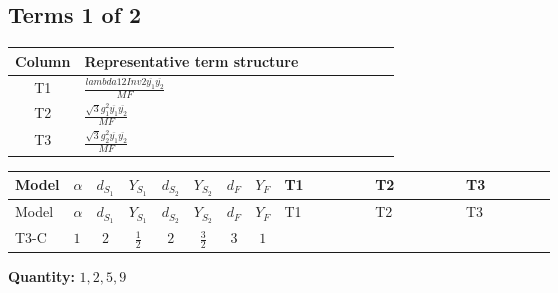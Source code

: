 \documentclass[8pt]{article}
\begin{document}
\begin{landscape}
\subsection*{Terms 1 of 2}
\begin{center}
\begin{tabular}{@{}c >{\raggedright\arraybackslash}p{0.82\linewidth}@{}}
\toprule
Column & Representative term structure \\
\midrule
T1 & \(\displaystyle \frac{lambda12Inv2 \overline{y_{1}} \overline{y_{2}}}{MF}\) \\
\midrule
T2 & \(\displaystyle \frac{\sqrt{3} g_{1}^{2} \overline{y_{1}} \overline{y_{2}}}{MF}\) \\
\midrule
T3 & \(\displaystyle \frac{\sqrt{3} g_{2}^{2} \overline{y_{1}} \overline{y_{2}}}{MF}\) \\
\midrule
\bottomrule
\end{tabular}
\end{center}
\smallskip
\tiny
\begin{longtable}{@{}llcccccc >{\raggedright\arraybackslash}p{0.21\linewidth} >{\raggedright\arraybackslash}p{0.21\linewidth} >{\raggedright\arraybackslash}p{0.21\linewidth}@{}}
\toprule
Model & $\alpha$ & $d_{S_1}$ & $Y_{S_1}$ & $d_{S_2}$ & $Y_{S_2}$ & $d_F$ & $Y_F$ & T1 & T2 & T3 \\
\midrule
\endfirsthead
\toprule
Model & $\alpha$ & $d_{S_1}$ & $Y_{S_1}$ & $d_{S_2}$ & $Y_{S_2}$ & $d_F$ & $Y_F$ & T1 & T2 & T3 \\
\midrule
\endhead
T3-C & $1$ & $2$ & $\frac{1}{2}$ & $2$ & $\frac{3}{2}$ & $3$ & $1$ & \scriptsize\adjustbox{max width=\linewidth}{$\begin{gathered} - \frac{lambda12Inv2 \overline{y_{1}} \overline{y_{2}}}{6 MF}\end{gathered}$} & \scriptsize\adjustbox{max width=\linewidth}{$\begin{gathered} - \frac{\sqrt{3} g_{1}^{2} \overline{y_{1}} \overline{y_{2}}}{4 MF}\end{gathered}$} & \scriptsize\adjustbox{max width=\linewidth}{$\begin{gathered} - \frac{\sqrt{3} g_{2}^{2} \overline{y_{1}} \overline{y_{2}}}{8 MF}\end{gathered}$} \\
\midrule
\bottomrule
\end{longtable}
\clearpage
\noindent\textbf{Quantity: }$\mathrm{1,2,5,9}$\par\smallskip

\end{landscape}
\end{document}
